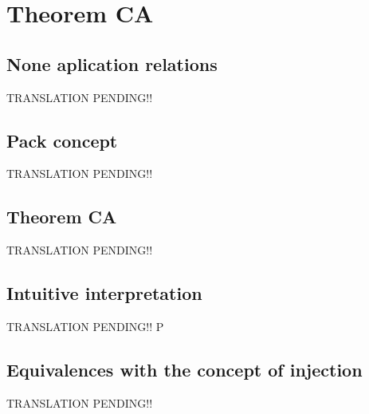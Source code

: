 \chapter{Theorem CA}

\newpage
\section{None aplication relations}
TRANSLATION PENDING!!

\newpage
\section{Pack concept}
TRANSLATION PENDING!!

\newpage
\section{Theorem CA}
TRANSLATION PENDING!!

\newpage
\section{Intuitive interpretation}
TRANSLATION PENDING!! P

\newpage
\section{Equivalences with the concept of injection}
TRANSLATION PENDING!!